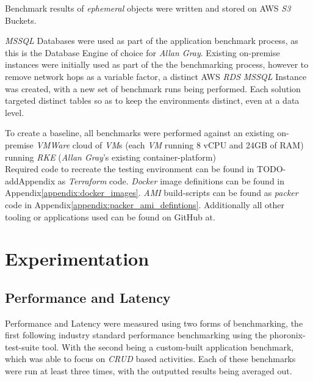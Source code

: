 Benchmark results of \emph{ephemeral} objects were written and stored on AWS \emph{S3} Buckets.

\emph{MSSQL} Databases were used as part of the application benchmark process, as this is the Database Engine of choice for \emph{Allan Gray}.
Existing on-premise instances were initially used as part of the the benchmarking process, however to remove network hops as a variable factor,
a distinct AWS \emph{RDS} \emph{MSSQL} Instance was created, with a new set of benchmark runs being performed.
Each solution targeted distinct tables so as to keep the environments distinct, even at a data level.

To create a baseline, all benchmarks were performed against an existing on-premise \emph{VMWare} cloud of \emph{VM}s (each \textit{VM} running 8 vCPU and 24GB of RAM) running \emph{RKE} (\emph{Allan Gray}'s existing container-platform) \\

\noindent Required code to recreate the testing environment can be found in TODO-addAppendix as \emph{Terraform} code.
\emph{Docker} image definitions can be found in Appendix\ref{appendix:docker_images}.
\emph{AMI} build-scripts can be found as \emph{packer} code in Appendix\ref{appendix:packer_ami_defintions}.
Additionally all other tooling or applications used can be found on GitHub at\cite{bodhanya_2022}.

\chapter{Experimentation}
\section{Performance and Latency}
Performance and Latency were measured using two forms of benchmarking, the first following industry standard performance benchmarking using the phoronix-test-suite\cite{phoronix_test_suite} tool.
With the second being a custom-built application benchmark, which was able to focus on \emph{CRUD} based activities.
Each of these benchmarks were run at least three times, with the outputted results being averaged out.

